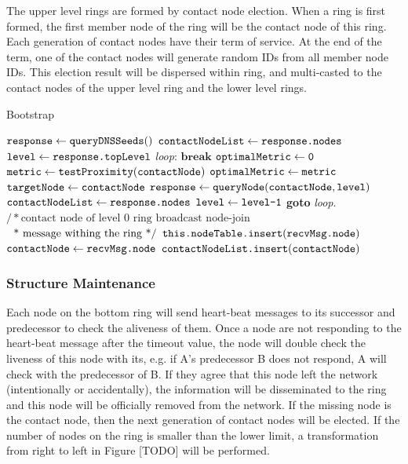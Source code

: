 The upper level rings are formed by contact node election. When a ring is first formed, the first member node of the ring will be the contact node of this ring. Each generation of contact nodes have their term of service. At the end of the term, one of the contact nodes will generate random IDs from all member node IDs. This election result will be dispersed within ring, and multi-casted to the contact nodes of the upper level ring and the lower level rings.

\begin{algorithm}
	\caption{Bootstrap}\label{euclid}
	\begin{algorithmic}[1]
		\State $\texttt{response} \gets \texttt{queryDNSSeeds}()$
		\State $\texttt{contactNodeList} \gets \texttt{response.nodes}$
		\State $\texttt{level} \gets \texttt{response.topLevel}$
		\BState \emph{loop}:
		\State $\textbf{break}$
		\Else
		\State $\texttt{optimalMetric} \gets \texttt{0}$
		\State $\texttt{metric} \gets \texttt{testProximity}(\texttt{contactNode})$
		\State $\texttt{optimalMetric} \gets \texttt{metric}$
		\State $\texttt{targetNode} \gets \texttt{contactNode}$
		\EndIf
		\EndFor
		\State $\texttt{response} \gets \texttt{queryNode}(\texttt{contactNode}, \texttt{level})$
		\State $\texttt{contactNodeList} \gets \texttt{response.nodes}$
		\State $\texttt{level} \gets \texttt{level}\texttt{-1}$
		\State \textbf{goto} \emph{loop}.
		\EndIf
		\State $/* \text{contact node of level 0 ring broadcast node-join}$
		\State $\text{\; * message withing the ring */}$
		\State $\texttt{this.}\texttt{nodeTable.insert}(\texttt{recvMsg.node})$
		\State $\texttt{contactNode} \gets \texttt{recvMsg.node}$
		\State $\texttt{contactNodeList.insert}(\texttt{contactNode})$
		\EndIf
		\EndProcedure
	\end{algorithmic}
\end{algorithm}

\subsubsection{Structure Maintenance} \label{maintain}

Each node on the bottom ring will send heart-beat messages to its successor and predecessor to check the aliveness of them. Once a node are not responding to the heart-beat message after the timeout value, the node will double check the liveness of this node with its, e.g. if A's predecessor B does not respond, A will check with the predecessor of B. If they agree that this node left the network (intentionally or accidentally), the information will be disseminated to the ring and this node will be officially removed from the network. If the missing node is the contact node, then the next generation of contact nodes will be elected. If the number of nodes on the ring is smaller than the lower limit, a transformation from right to left in Figure [TODO] will be performed.

